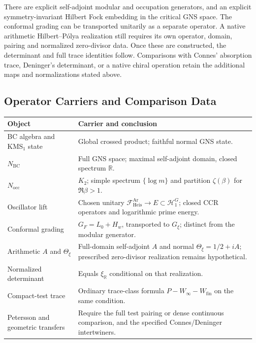 \begin{remark}
\label{v4-arith:w5-b:rem:honest-conditional}
There are explicit self-adjoint modular and occupation generators,
and an explicit symmetry-invariant Hilbert Fock embedding in the
critical GNS space. The conformal grading can be transported
unitarily as a separate operator. A native arithmetic
Hilbert--P\'olya realization still requires its own operator,
domain, pairing and normalized zero-divisor data. Once these are
constructed, the determinant and full trace identities follow.
Comparisons with Connes' absorption trace, Deninger's determinant,
or a native chiral operation retain the additional maps and
normalizations stated above.
\end{remark}

\subsection{Operator Carriers and Comparison Data}
\label{v4-arith:w5-b:form:summary}

\begin{center}
\small
\begin{tabular}{p{}|p{}}
Object & Carrier and conclusion \\
\hline
BC algebra and KMS$_1$ state & Global crossed product; faithful normal GNS state. \\
$N_{\mathrm{BC}}$ & Full GNS space; maximal self-adjoint domain, closed spectrum $\mathbb R$. \\
$N_{\mathrm{occ}}$ & $K_2$; simple spectrum $\{\log m\}$ and partition $\zeta(\beta)$ for $\Re\beta>1$. \\
Oscillator lift & Chosen unitary $\mathcal F^{\mathrm{Ar}}_{\mathrm{Heis}}\to E\subset\mathcal H_1^G$; closed CCR operators and logarithmic prime energy. \\
Conformal grading & $G_F=L_0+H_w$, transported to $G_\xi$; distinct from the modular generator. \\
Arithmetic $A$ and $\Theta_\xi$ & Full-domain self-adjoint $A$ and normal $\Theta_\xi=1/2+iA$; prescribed zero-divisor realization remains hypothetical. \\
Normalized determinant & Equals $\xi_{\mathbb R}$ conditional on that realization. \\
Compact-test trace & Ordinary trace-class formula $P-W_\infty-W_{\mathrm{fin}}$ on the same condition. \\
Petersson and geometric transfers & Require the full test pairing or dense continuous comparison, and the specified Connes/Deninger intertwiners.
\end{tabular}
\end{center}

